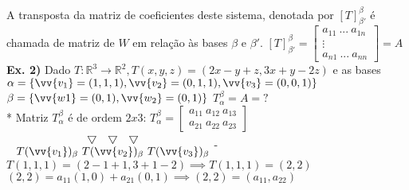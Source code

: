 \documentclass[11pt,a4paper]{article}
\newcommand\tab[1][1.835cm]{\hspace*{#1}}
\begin{document}
\begin{flushleft}
\newline \tab A transposta da matriz de coeficientes deste sistema, denotada por ${[T]_{\beta'}^\beta}$ é chamada de matriz de $W$ em relação às bases $\beta$ e $\beta'$. \linebreak
\newline \tab ${[T]_{\beta'}^\beta} = \begin{bmatrix} a_{11} \ ... \ a_{1n} \\ \vdots \\ a_{n1} \ ... \ a_{nn} \end{bmatrix} = A$ \linebreak \newline
\\
\tab \textbf{Ex. 2)} Dado $T: \mathbb{R}^3 \rightarrow \mathbb{R}^2, T(x,y,z) = (2x-y+z,3x+y-2z)$  e as bases \linebreak \tab $\alpha = \{\vv{v_1} = (1,1,1), \vv{v_2} = (0,1,1), \vv{v_3} = (0,0,1)\}$ \linebreak \tab $\beta = \{\vv{w1} = (0,1),  \vv{w_2} = (0,1)\}$ \linebreak \tab $T_\alpha^\beta = A = ?$ \linebreak  \newline 
\\
\tab * Matriz $T_\alpha^\beta$ é de ordem $2x3$:\newline
\tab $T_\alpha^\beta=\begin{bmatrix} a_{11} \ a_{12} \ a_{13} \\ a_{21} \ a_{22} \ a_{23} \end{bmatrix}$ \linebreak
\tab $\hspace{0.1cm}\begin{matrix}\hspace{0.2cm}\bigtriangledown \hspace{0.15cm}\ \bigtriangledown \ \hspace{0.15cm} \bigtriangledown\\ \hspace{0.2cm} T({\vv{v_1})_\beta} \ T{(\vv{v_2})_\beta} \ T{(\vv{v_3})_\beta}\end{matrix}$ \linebreak
\newline 
\newline \tab - $T(1,1,1) = (2-1+1,3+1-2) \implies T(1,1,1) = (2,2)$ 
\newline \tab $(2,2) = a_{11}(1,0) + a_{21}(0,1) \implies (2,2) = (a_{11}, a_{22})$  \linebreak

\end{flushleft}
\end{document}
